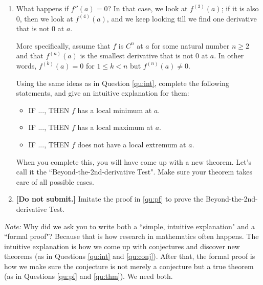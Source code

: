 \documentclass[12pt]{exam}
\begin{document}
\begin{enumerate}
\begin{enumerate}
		\item \label{qu:conj} What happens if $f''(a)=0$?     In that case, we look at $f^{(3)}(a)$;  if it is also $0$, then we look at $f^{(4)}(a)$, and we keep looking till we find one derivative that is not $0$ at $a$.   
		
		More specifically, assume that $f$ is $C^n$ at $a$ for some natural number $n \geq 2$ and that $f^{(n)}(a)$ is the smallest derivative  that is not $0$ at $a$.   In other words, $f^{(k)}(a) =0$ for $ 1 \leq k < n$ but $f^{(n)}(a) \neq 0$.
		
		Using the same ideas as in Question \ref{qu:int}, complete the following statements, and give an intuitive explanation for them:
			\begin{itemize}
				\item  IF ..., THEN $f$ has a local minimum at $a$.
				\item  IF ..., THEN $f$ has a local maximum at $a$.
				\item  IF ..., THEN $f$ does not have a local extremum at $a$.
			\end{itemize}
		When you complete this, you will have come up with a new theorem.  Let's call it the ``Beyond-the-2nd-derivative Test".   Make sure your theorem takes care of all possible cases.  
		\item \label{qu:thm}  {\bf [Do not submit.]}  Imitate the proof in \ref{qu:pf} to prove the Beyond-the-2nd-derivative Test.		
	\end{enumerate}

\emph{Note:}  Why did we ask you to write both a ``simple, intuitive explanation" and a ``formal proof"?  Because that is how research in mathematics often happens.  The intuitive explanation is how we come up with conjectures and discover new theorems (as in Questions \ref{qu:int} and \ref{qu:conj}).   After that, the formal proof is how we make sure the conjecture is not merely a conjecture but a true theorem (as in Questions \ref{qu:pf} and \ref{qu:thm}).   We need both.

\end{enumerate}
\end{document}

